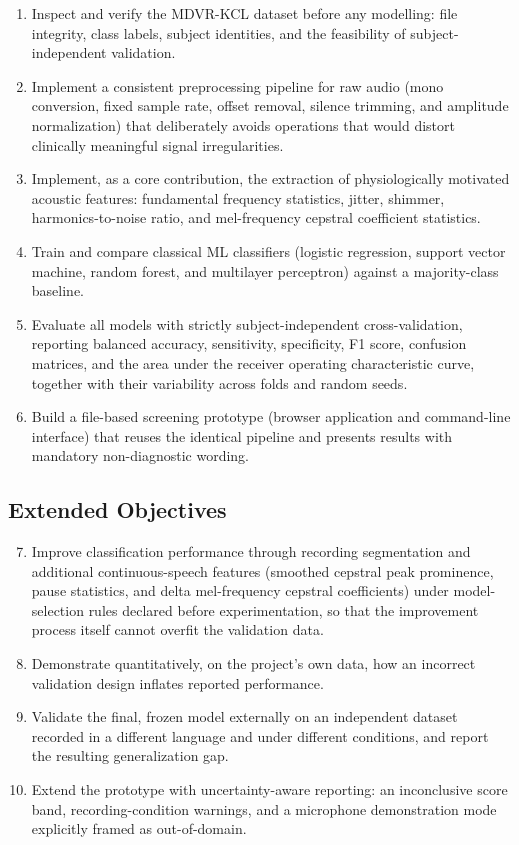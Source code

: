 \begin{enumerate}
  \item Inspect and verify the MDVR-KCL dataset before any modelling:
        file integrity, class labels, subject identities, and the
        feasibility of subject-independent validation.
  \item Implement a consistent preprocessing pipeline for raw audio
        (mono conversion, fixed sample rate, offset removal, silence
        trimming, and amplitude normalization) that deliberately avoids
        operations that would distort clinically meaningful signal
        irregularities.
  \item Implement, as a core contribution, the extraction of
        physiologically motivated acoustic features: fundamental
        frequency statistics, jitter, shimmer, harmonics-to-noise
        ratio, and mel-frequency cepstral coefficient statistics.
  \item Train and compare classical ML classifiers (logistic
        regression, support vector machine, random forest, and
        multilayer perceptron) against a majority-class baseline.
  \item Evaluate all models with strictly subject-independent
        cross-validation, reporting balanced accuracy, sensitivity,
        specificity, F1 score, confusion matrices, and the area under
        the receiver operating characteristic curve, together with
        their variability across folds and random seeds.
  \item Build a file-based screening prototype (browser application and
        command-line interface) that reuses the identical pipeline and
        presents results with mandatory non-diagnostic wording.
\end{enumerate}

\subsection{Extended Objectives}

\begin{enumerate}
  \setcounter{enumi}{6}
  \item Improve classification performance through recording
        segmentation and additional continuous-speech features
        (smoothed cepstral peak prominence, pause statistics, and
        delta mel-frequency cepstral coefficients) under
        model-selection rules declared before experimentation, so that
        the improvement process itself cannot overfit the validation
        data.
  \item Demonstrate quantitatively, on the project's own data, how an
        incorrect validation design inflates reported performance.
  \item Validate the final, frozen model externally on an independent
        dataset recorded in a different language and under different
        conditions, and report the resulting generalization gap.
  \item Extend the prototype with uncertainty-aware reporting: an
        inconclusive score band, recording-condition warnings, and a
        microphone demonstration mode explicitly framed as
        out-of-domain.
\end{enumerate}

